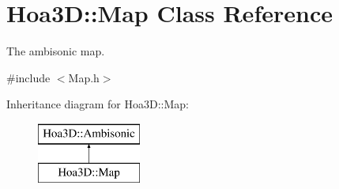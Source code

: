 \hypertarget{class_hoa3_d_1_1_map}{\section{Hoa3\-D\-:\-:Map Class Reference}
\label{class_hoa3_d_1_1_map}
}


The ambisonic map.  




{\ttfamily \#include $<$Map.\-h$>$}

Inheritance diagram for Hoa3\-D\-:\-:Map\-:\begin{figure}[H]
\begin{center}
\leavevmode
\includegraphics[height=2.000000cm]{class_hoa3_d_1_1_map}
\end{center}
\end{figure}
